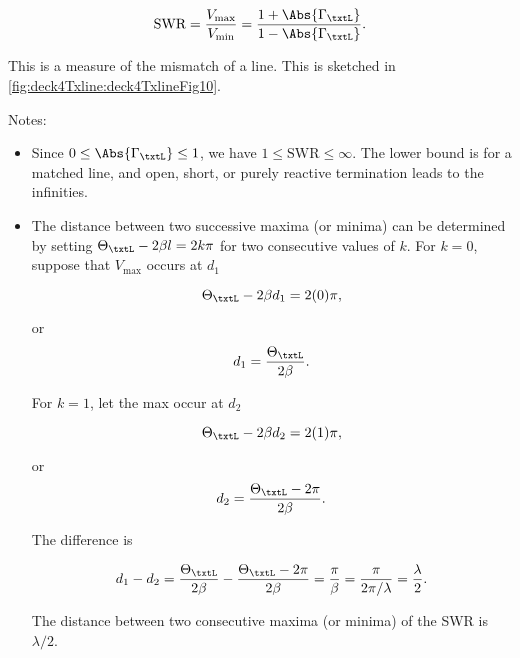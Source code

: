\begin{equation}\label{eqn:uwaves4TransmissionLines:1200}
\textrm{SWR} = \frac{V_{\mathrm{max}}}{V_{\mathrm{min}}} = \frac{ 1 + \Abs{\Gamma_\txtL} }{ 1 - \Abs{\Gamma_\txtL} }.
\end{equation}

This is a measure of the mismatch of a line.  This is sketched in \cref{fig:deck4Txline:deck4TxlineFig10}.


Notes:

\begin{itemize}
\item Since \( 0 \le \Abs{\Gamma_\txtL} \le 1 \), we have \( 1 \le \textrm{SWR} \le \infty \).  The lower bound is for a matched line, and open, short, or purely reactive termination leads to the infinities.
\item The distance between two successive maxima (or minima) can be determined by setting \( \Theta_\txtL - 2 \beta l = 2 k \pi \) for two consecutive values of \( k \).  For \( k = 0 \), suppose that \( V_{\mathrm{max}} \) occurs at \( d_1 \)

\begin{dmath}\label{eqn:uwaves4TransmissionLines:1220}
\Theta_\txtL - 2 \beta d_1 = 2 (0) \pi,
\end{dmath}

or
\begin{dmath}\label{eqn:uwaves4TransmissionLines:1240}
d_1 = \frac{\Theta_\txtL}{2 \beta}.
\end{dmath}

For \( k = 1 \), let the max occur at \( d_2 \)

\begin{dmath}\label{eqn:uwaves4TransmissionLines:1260}
\Theta_\txtL - 2 \beta d_2 = 2 (1) \pi,
\end{dmath}

or
\begin{dmath}\label{eqn:uwaves4TransmissionLines:1280}
d_2 = \frac{\Theta_\txtL - 2 \pi}{2 \beta}.
\end{dmath}

The difference is

\begin{dmath}\label{eqn:uwaves4TransmissionLines:1300}
d_1 - d_2
= \frac{\Theta_\txtL}{2 \beta} - \frac{\Theta_\txtL - 2 \pi}{2 \beta}
= \frac{\pi}{\beta}
= \frac{\pi}{2 \pi/\lambda}
= \frac{\lambda}{2}.
\end{dmath}

The distance between two consecutive maxima (or minima) of the SWR is \( \lambda/2 \).

\end{itemize}

